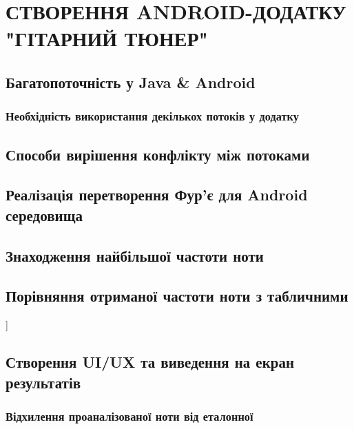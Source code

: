 \section{СТВОРЕННЯ ANDROID-ДОДАТКУ "ГІТАРНИЙ ТЮНЕР"}

\subsection{Багатопоточність у Java \& Android}

\lipsum[1]

\subsubsection{Необхідність використання декількох потоків у додатку}

\lipsum[1]

\subsection{Способи вирішення конфлікту між потоками}

\lipsum[1]

\subsection{Реалізація перетворення Фур'є для Android середовища}

\lipsum[1]

\subsection{Знаходження найбільшої частоти ноти}

\lipsum[1]

\subsection{Порівняння отриманої частоти ноти з табличними}

\lipsum[1]]

\subsection{Створення UI/UX та виведення на екран результатів}

\lipsum[1]

\subsubsection{Відхилення проаналізованої ноти від еталонної}

